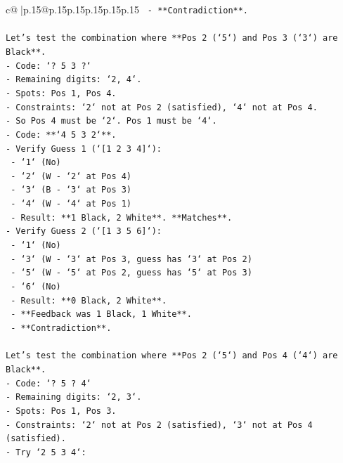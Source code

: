 \documentclass{article}
\begin{document}
{\begin{supertabular}{c@{$\;$}|p{.15\linewidth}@{}p{.15\linewidth}p{.15\linewidth}p{.15\linewidth}p{.15\linewidth}p{.15\linewidth}}
{{{\texttt{    {-}   **Contradiction**.} \\
\\ 
\texttt{Let's test the combination where **Pos 2 (`5`) and Pos 3 (`3`) are Black**.} \\
\texttt{{-}   Code: `? 5 3 ?`} \\
\texttt{{-}   Remaining digits: `2, 4`.} \\
\texttt{{-}   Spots: Pos 1, Pos 4.} \\
\texttt{{-}   Constraints: `2` not at Pos 2 (satisfied), `4` not at Pos 4.} \\
\texttt{{-}   So Pos 4 must be `2`. Pos 1 must be `4`.} \\
\texttt{{-}   Code: **`4 5 3 2`**.} \\
\texttt{{-}   Verify Guess 1 (`{[}1 2 3 4{]}`):} \\
\texttt{    {-}   `1` (No)} \\
\texttt{    {-}   `2` (W {-} `2` at Pos 4)} \\
\texttt{    {-}   `3` (B {-} `3` at Pos 3)} \\
\texttt{    {-}   `4` (W {-} `4` at Pos 1)} \\
\texttt{    {-}   Result: **1 Black, 2 White**. **Matches**.} \\
\texttt{{-}   Verify Guess 2 (`{[}1 3 5 6{]}`):} \\
\texttt{    {-}   `1` (No)} \\
\texttt{    {-}   `3` (W {-} `3` at Pos 3, guess has `3` at Pos 2)} \\
\texttt{    {-}   `5` (W {-} `5` at Pos 2, guess has `5` at Pos 3)} \\
\texttt{    {-}   `6` (No)} \\
\texttt{    {-}   Result: **0 Black, 2 White**.} \\
\texttt{    {-}   **Feedback was 1 Black, 1 White**.} \\
\texttt{    {-}   **Contradiction**.} \\
\\ 
\texttt{Let's test the combination where **Pos 2 (`5`) and Pos 4 (`4`) are Black**.} \\
\texttt{{-}   Code: `? 5 ? 4`} \\
\texttt{{-}   Remaining digits: `2, 3`.} \\
\texttt{{-}   Spots: Pos 1, Pos 3.} \\
\texttt{{-}   Constraints: `2` not at Pos 2 (satisfied), `3` not at Pos 4 (satisfied).} \\
\texttt{{-}   Try `2 5 3 4`:} \\
}}}
\end{supertabular}}
\end{document}
